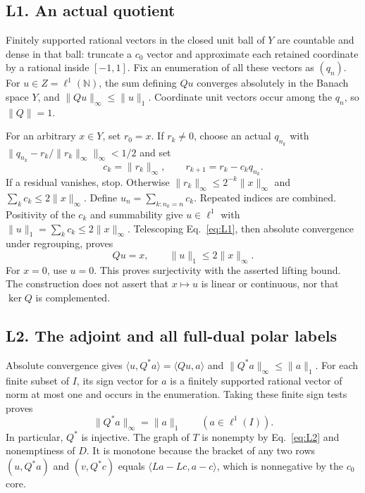 \documentclass[11pt]{article}
\newcommand{\N}{\mathbb N}
\newcommand{\pair}[2]{\langle #1,#2\rangle}
\begin{document}
\subsection{L1. An actual quotient}
\label{sec:L1}
Finitely supported rational vectors in the closed unit ball of $Y$ are
countable and dense in that ball: truncate a $c_0$ vector and approximate
each retained coordinate by a rational inside $[-1,1]$. Fix an enumeration
of all these vectors as $(q_n)$. For $u\in Z=\ell^1(\N)$, the sum defining
$Qu$ converges absolutely in the Banach space $Y$, and
$\|Qu\|_\infty\le\|u\|_1$. Coordinate unit vectors occur among the $q_n$,
so $\|Q\|=1$.

For an arbitrary $x\in Y$, set $r_0=x$. If $r_k\ne0$, choose an actual
$q_{n_k}$ with $\|q_{n_k}-r_k/\|r_k\|_\infty\|_\infty<1/2$ and set
\begin{equation}
c_k=\|r_k\|_\infty,\qquad r_{k+1}=r_k-c_kq_{n_k}.
\tag{L1}\label{eq:L1}
\end{equation}
If a residual vanishes, stop. Otherwise
$\|r_k\|_\infty\le2^{-k}\|x\|_\infty$ and $\sum_k c_k\le2\|x\|_\infty$.
Define $u_n=\sum_{k:n_k=n}c_k$. Repeated indices are combined.
Positivity of the $c_k$ and summability give $u\in\ell^1$ with
$\|u\|_1=\sum_k c_k\le2\|x\|_\infty$.
Telescoping Eq.~\eqref{eq:L1}, then absolute convergence under regrouping,
proves
\begin{equation}
Qu=x,\qquad \|u\|_1\le2\|x\|_\infty.
\tag{L2}\label{eq:L2}
\end{equation}
For $x=0$, use $u=0$. This proves surjectivity with the asserted lifting
bound. The construction does not assert that $x\mapsto u$ is linear or
continuous, nor that $\ker Q$ is complemented.

\subsection{L2. The adjoint and all full-dual polar labels}
\label{sec:L2}
Absolute convergence gives $\pair{u}{Q^*a}=\pair{Qu}{a}$ and
$\|Q^*a\|_\infty\le\|a\|_1$. For each finite subset of $I$, its sign
vector for $a$ is a finitely supported rational vector of norm at most
one and occurs in the enumeration. Taking these finite sign tests proves
\begin{equation}
\|Q^*a\|_\infty=\|a\|_1\qquad(a\in\ell^1(I)).
\tag{L3}\label{eq:L3}
\end{equation}
In particular, $Q^*$ is injective. The graph of $T$ is nonempty by
Eq.~\eqref{eq:L2} and nonemptiness of $D$. It is monotone because the
bracket of any two rows $(u,Q^*a)$ and $(v,Q^*c)$ equals
$\pair{La-Lc}{a-c}$, which is nonnegative by the $c_0$ core.
\end{document}

